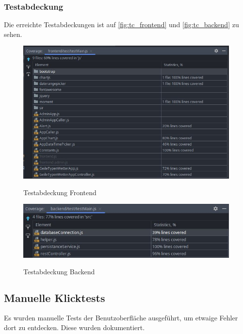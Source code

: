 \subsubsection{Testabdeckung}
Die erreichte Testabdeckungen ist auf \autoref{fig:tc_frontend} und \autoref{fig:tc_backend} zu sehen.
\begin{figure}[H]
    \centering
    \begin{minipage}[t]{1\textwidth}
        \caption{Testabdeckung Frontend}
        \includegraphics[width=1\textwidth]{img/tc_frontend2.png}\\
        \label{fig:tc_frontend}
    \end{minipage}
\end{figure}
\begin{figure}[H]
    \centering
    \begin{minipage}[t]{1\textwidth}
        \caption{Testabdeckung Backend}
        \includegraphics[width=1\textwidth]{img/tc_backend2.png}\\
        \label{fig:tc_backend}
    \end{minipage}
\end{figure}
\subsection{Manuelle Klicktests}
Es wurden manuelle Tests der Benutzoberfläche ausgeführt, um etwaige Fehler dort zu entdecken.
Diese wurden dokumentiert.

